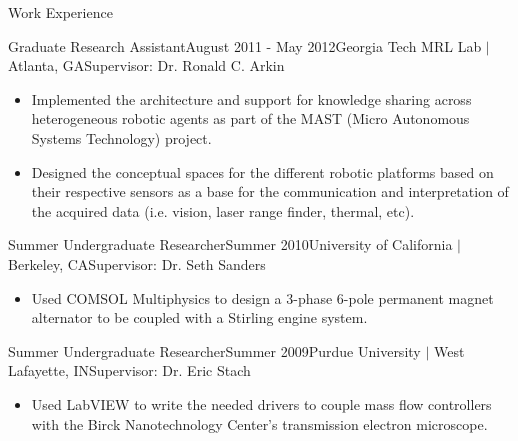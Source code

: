 \documentclass{resume} %
\begin{document}
\begin{rSection}{Work Experience}

\begin{rSubsection}{Graduate Research Assistant}{August 2011 - May 2012}{Georgia Tech MRL Lab $\vert$ Atlanta, GA}{Supervisor: Dr. Ronald C. Arkin}

\item
\begin{itemize}

\item Implemented the architecture and support for knowledge sharing across
  heterogeneous robotic agents as part of the MAST (Micro Autonomous Systems
  Technology) project.

\item Designed the conceptual spaces for the different robotic platforms based
  on their respective sensors as a base for the communication and interpretation
  of the acquired data (i.e. vision, laser range finder, thermal, etc).

\end{itemize}

\end{rSubsection}


\begin{rSubsection}{Summer Undergraduate Researcher}{Summer 2010}{University of California $\vert$ Berkeley, CA}{Supervisor: Dr. Seth Sanders}

\item
\begin{itemize}
\item Used COMSOL Multiphysics to design a 3-phase 6-pole permanent magnet
  alternator to be coupled with a Stirling engine system.
\end{itemize}

\end{rSubsection}


\begin{rSubsection}{Summer Undergraduate Researcher}{Summer 2009}{Purdue University $\vert$ West Lafayette, IN}{Supervisor: Dr. Eric Stach}

\item
\begin{itemize}
\item Used LabVIEW to write the needed drivers to couple mass flow controllers
  with the Birck Nanotechnology Center's transmission electron microscope.
\end{itemize}


\end{rSubsection}
\end{rSection}
\end{document}
